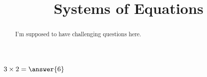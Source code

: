 \documentclass{ximera}
\title{Systems of Equations}
\begin{document}
  
\begin{abstract}  
I'm supposed to have challenging questions here.
\end{abstract}  
\maketitle
\begin{question}  
$3\times 2 = \answer{6}$  
\end{question}
\end{document}

